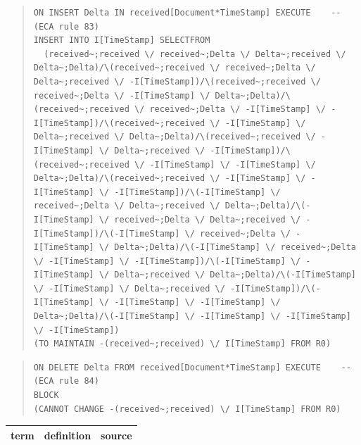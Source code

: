 \documentclass[10pt,a4paper]{report}              %
\theoremstyle{plain}\theorembodyfont{\rmfamily}\newtheorem{definition}{Definition}[section]
\theoremstyle{plain}\theorembodyfont{\rmfamily}\newtheorem{designrule}[definition]{Requirement}
\begin{document}
\begin{quote}
\begin{verbatim}
ON INSERT Delta IN received[Document*TimeStamp] EXECUTE    -- (ECA rule 83)
INSERT INTO I[TimeStamp] SELECTFROM
  (received~;received \/ received~;Delta \/ Delta~;received \/ Delta~;Delta)/\(received~;received \/ received~;Delta \/ Delta~;received \/ -I[TimeStamp])/\(received~;received \/ received~;Delta \/ -I[TimeStamp] \/ Delta~;Delta)/\(received~;received \/ received~;Delta \/ -I[TimeStamp] \/ -I[TimeStamp])/\(received~;received \/ -I[TimeStamp] \/ Delta~;received \/ Delta~;Delta)/\(received~;received \/ -I[TimeStamp] \/ Delta~;received \/ -I[TimeStamp])/\(received~;received \/ -I[TimeStamp] \/ -I[TimeStamp] \/ Delta~;Delta)/\(received~;received \/ -I[TimeStamp] \/ -I[TimeStamp] \/ -I[TimeStamp])/\(-I[TimeStamp] \/ received~;Delta \/ Delta~;received \/ Delta~;Delta)/\(-I[TimeStamp] \/ received~;Delta \/ Delta~;received \/ -I[TimeStamp])/\(-I[TimeStamp] \/ received~;Delta \/ -I[TimeStamp] \/ Delta~;Delta)/\(-I[TimeStamp] \/ received~;Delta \/ -I[TimeStamp] \/ -I[TimeStamp])/\(-I[TimeStamp] \/ -I[TimeStamp] \/ Delta~;received \/ Delta~;Delta)/\(-I[TimeStamp] \/ -I[TimeStamp] \/ Delta~;received \/ -I[TimeStamp])/\(-I[TimeStamp] \/ -I[TimeStamp] \/ -I[TimeStamp] \/ Delta~;Delta)/\(-I[TimeStamp] \/ -I[TimeStamp] \/ -I[TimeStamp] \/ -I[TimeStamp])
(TO MAINTAIN -(received~;received) \/ I[TimeStamp] FROM R0)
\end{verbatim}
\end{quote}
\begin{quote}
\begin{verbatim}
ON DELETE Delta FROM received[Document*TimeStamp] EXECUTE    -- (ECA rule 84)
BLOCK
(CANNOT CHANGE -(received~;received) \/ I[TimeStamp] FROM R0)
\end{verbatim}
\end{quote}
\begin{center}
\begin{tabular}{lll}
term & definition & source\\
\hline
\end{tabular}
\end{center}
\end{document}

